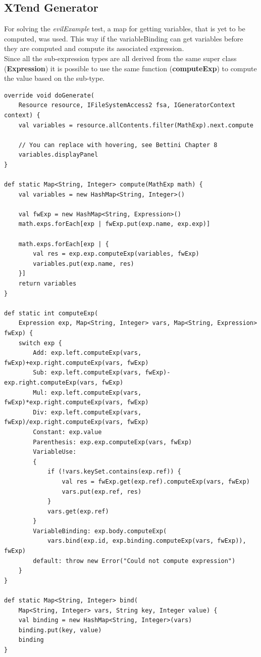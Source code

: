 \documentclass{article}
\begin{document}
\subsection{XTend Generator}

For solving the \textit{evilExample} test, a map for getting variables, that is yet to be computed, was used. This way if the variableBinding can get variables before they are computed and compute its associated expression.\\
Since all the sub-expression types are all derived from the same super class (\textbf{Expression}) it is possible to use the same function (\textbf{computeExp}) to compute the value based on the sub-type.

\begin{lstlisting}[language={xtend}, caption={XTend generator}, captionpos={b}]
override void doGenerate(
    Resource resource, IFileSystemAccess2 fsa, IGeneratorContext context) {
    val variables = resource.allContents.filter(MathExp).next.compute
    
    // You can replace with hovering, see Bettini Chapter 8
    variables.displayPanel
}

def static Map<String, Integer> compute(MathExp math) {
    val variables = new HashMap<String, Integer>()
    
    val fwExp = new HashMap<String, Expression>()
    math.exps.forEach[exp | fwExp.put(exp.name, exp.exp)]
    
    math.exps.forEach[exp | {
        val res = exp.exp.computeExp(variables, fwExp)         
        variables.put(exp.name, res)
    }]
    return variables
}

def static int computeExp(
    Expression exp, Map<String, Integer> vars, Map<String, Expression> fwExp) {
    switch exp {
        Add: exp.left.computeExp(vars, fwExp)+exp.right.computeExp(vars, fwExp)
        Sub: exp.left.computeExp(vars, fwExp)-exp.right.computeExp(vars, fwExp)
        Mul: exp.left.computeExp(vars, fwExp)*exp.right.computeExp(vars, fwExp)
        Div: exp.left.computeExp(vars, fwExp)/exp.right.computeExp(vars, fwExp)
        Constant: exp.value
        Parenthesis: exp.exp.computeExp(vars, fwExp)
        VariableUse:
        {
            if (!vars.keySet.contains(exp.ref)) {
                val res = fwExp.get(exp.ref).computeExp(vars, fwExp)
                vars.put(exp.ref, res)
            }
            vars.get(exp.ref)
        }
        VariableBinding: exp.body.computeExp(
            vars.bind(exp.id, exp.binding.computeExp(vars, fwExp)), fwExp)
        default: throw new Error("Could not compute expression")
    }
}

def static Map<String, Integer> bind(
    Map<String, Integer> vars, String key, Integer value) {
    val binding = new HashMap<String, Integer>(vars)
    binding.put(key, value)
    binding
}
\end{lstlisting}
\end{document}
